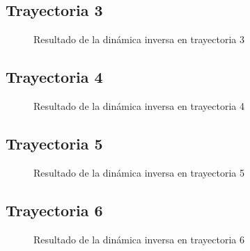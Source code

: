         \newpage
        
        
    \subsection{Trayectoria 3}
    
        \begin{figure}[h]
            \centering
            \caption{Resultado de la dinámica inversa en trayectoria 3}
            \label{f:cap7_tray3}
        \end{figure}
                
    \subsection{Trayectoria 4}
    
        \begin{figure}[h]
            \centering
            \caption{Resultado de la dinámica inversa en trayectoria 4}
            \label{f:cap7_tray4}
        \end{figure}
        
        \newpage
        
    \subsection{Trayectoria 5}
    
        \begin{figure}[h]
            \centering
            \caption{Resultado de la dinámica inversa en trayectoria 5}
            \label{f:cap7_tray5}
        \end{figure}
                
    \subsection{Trayectoria 6}
    
        \begin{figure}[h]
            \centering
            \caption{Resultado de la dinámica inversa en trayectoria 6}
            \label{f:cap7_tray6}
        \end{figure}
        
